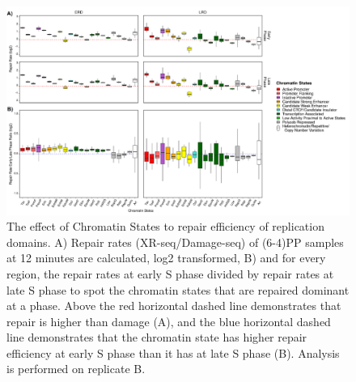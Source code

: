 \begin{figure}[H]
\begin{center}
\includegraphics[width=\textwidth]{Chapters/7_appendix/figures/supfig14}
\caption[The effect of Chromatin States to repair efficiency of replication domains for (6-4)PP samples at 12 minutes (replicate B).]{The effect of Chromatin States to repair efficiency of replication domains. A) Repair rates (XR-seq/Damage-seq) of (6-4)PP samples at 12 minutes are calculated, log2 transformed, B) and for every region, the repair rates at early S phase divided by repair rates at late S phase to spot the chromatin states that are repaired dominant at a phase. Above the red horizontal dashed line demonstrates that repair is higher than damage (A), and the blue horizontal dashed line demonstrates that the chromatin state has higher repair efficiency at early S phase than it has at late S phase (B). Analysis is performed on replicate B.}
\label{supfig:chromatin2}
\end{center}
\end{figure}

